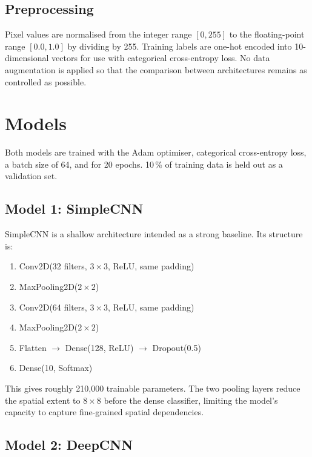 \documentclass[conference]{IEEEtran}
\begin{document}
\subsection{Preprocessing}

Pixel values are normalised from the integer range $[0, 255]$ to the
floating-point range $[0.0, 1.0]$ by dividing by 255.
Training labels are one-hot encoded into 10-dimensional vectors for use with
categorical cross-entropy loss.
No data augmentation is applied so that the comparison between architectures
remains as controlled as possible.

\section{Models}

Both models are trained with the Adam optimiser, categorical cross-entropy loss,
a batch size of 64, and for 20 epochs.
10\,\% of training data is held out as a validation set.

\subsection{Model 1: SimpleCNN}

SimpleCNN is a shallow architecture intended as a strong baseline.
Its structure is:

\begin{enumerate}
  \item Conv2D(32 filters, $3\times3$, ReLU, same padding)
  \item MaxPooling2D($2\times2$)
  \item Conv2D(64 filters, $3\times3$, ReLU, same padding)
  \item MaxPooling2D($2\times2$)
  \item Flatten $\to$ Dense(128, ReLU) $\to$ Dropout(0.5)
  \item Dense(10, Softmax)
\end{enumerate}

This gives roughly 210{,}000 trainable parameters.
The two pooling layers reduce the spatial extent to $8\times8$ before the
dense classifier, limiting the model's capacity to capture fine-grained spatial
dependencies.

\subsection{Model 2: DeepCNN}
\end{document}
